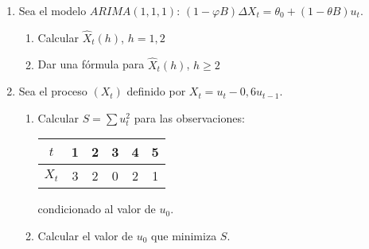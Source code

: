 \begin{enumerate}
\item Sea el modelo $ARIMA ( 1, 1, 1)$: $(1-\varphi B) \Delta  X_{t}=\theta_{0} +(1-\theta B) u_{t}$.
\begin{enumerate}
 \item Calcular $\widehat{X}_{t} (h)$, $h= 1, 2$
\item Dar una f\'{o}rmula para $\widehat{X}_{t} (h)$, $h \ge 2$
\end{enumerate}

\item Sea el proceso $(X_{t})$ definido por $X_{t} =u_{t} -0,6u_{t-1} $.
\begin{enumerate}
 \item Calcular $S=\sum {u_{t}^{2} }$ para las observaciones:
 \begin{center}
\begin{tabular}{@{}cccccc@{}}
\toprule
$t$& 1& 2& 3& 4& 5 \\
\midrule
$X_{t}$& 3& 2& 0& 2& 1 \\
\bottomrule
\end{tabular}
\end{center}
condicionado al valor de $u_{0}$.

\item Calcular el valor de $u_{0}$ que minimiza $S$.
\end{enumerate}

\end{enumerate}